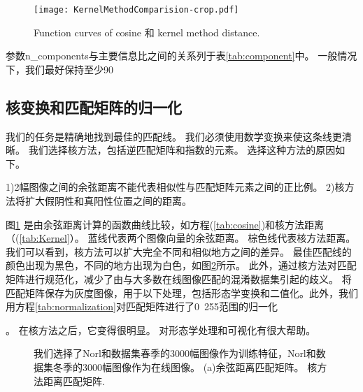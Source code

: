 {\begin{figure}[H]
  \centering
  \texttt{[image: KernelMethodComparision-crop.pdf]}
  \caption{Function curves of cosine 和 kernel method distance.}
  \label{fig:Distance}
\end{figure}

参数n_components与主要信息比之间的关系列于表\ref{tab:component}中。 一般情况下，我们最好保持至少90%

\subsection{核变换和匹配矩阵的归一化}

 我们的任务是精确地找到最佳的匹配线。 我们必须使用数学变换来使这条线更清晰。 我们选择核方法，包括逆匹配矩阵和指数的元素。 选择这种方法的原因如下。

1)2幅图像之间的余弦距离不能代表相似性与匹配矩阵元素之间的正比例。
2)核方法将扩大假阴性和真阳性位置之间的距离。

图\ref{fig:Distance} 是由余弦距离计算的函数曲线比较，如方程(\ref{tab:cosine})和核方法距离（(\ref{tab:Kernel}）。 蓝线代表两个图像向量的余弦距离。 棕色线代表核方法距离。 我们可以看到，核方法可以扩大完全不同和相似地方之间的差异。 最佳匹配线的颜色出现为黑色，不同的地方出现为白色，如图\ref{fig:KernelMatrix}所示。 此外，通过核方法对匹配矩阵进行规范化，减少了由与大多数在线图像匹配的混淆数据集引起的歧义。 将匹配矩阵保存为灰度图像，用于以下处理，包括形态学变换和二值化。此外，我们用方程\ref{tab:normalization}对匹配矩阵进行了0~255范围的归一化}。 在核方法之后，它变得很明显。 对形态学处理和可视化有很大帮助。

\begin{figure}[H]
\centering
{}
 \hspace{1in}
\caption{我们选择了Norl和数据集春季的3000幅图像作为训练特征，Norl和数据集冬季的3000幅图像作为在线图像。 (a)余弦距离匹配矩阵。 核方法距离匹配矩阵.}
\label{fig:KernelMatrix}
\end{figure}

